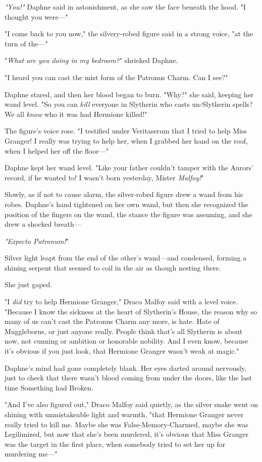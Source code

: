 \emph{"You!"} Daphne said in astonishment, as she saw the face beneath the 
hood. "I thought you were---"

"I come back to you now," the silvery-robed figure said in a strong voice, "at 
the turn of the---"

"\emph{What are you doing in my bedroom?}" shrieked Daphne.

"I heard you can cast the mist form of the Patronus Charm. Can I see?"

Daphne stared, and then her blood began to burn. "Why?" she said, keeping her 
wand level. "So you can \emph{kill} everyone in Slytherin who casts 
un-Slytherin spells? We all \emph{know} who it was had Hermione killed!"

The figure's voice rose. "I testified under Veritaserum that I tried to help 
Miss Granger! I really was trying to help her, when I grabbed her hand on the 
roof, when I helped her off the floor---"

Daphne kept her wand level. "Like your father couldn't tamper with the Aurors' 
record, if he wanted to! I wasn't born yesterday, Mister \emph{Malfoy!}"

Slowly, as if not to cause alarm, the silver-robed figure drew a wand from his 
robes. Daphne's hand tightened on her own wand, but then she recognized the 
position of the fingers on the wand, the stance the figure was assuming, and 
she drew a shocked breath---

\emph{"Expecto Patronum!}"

Silver light leapt from the end of the other's wand---and condensed, forming a 
shining serpent that seemed to coil in the air as though nesting there.

She just gaped.

"I \emph{did} try to help Hermione Granger," Draco Malfoy said with a level 
voice. "Because I know the sickness at the heart of Slytherin's House, the 
reason why so many of us can't cast the Patronus Charm any more, is hate. Hate 
of Muggleborns, or just anyone really. People think that's all Slytherin is 
about now, not cunning or ambition or honorable nobility. And I even know, 
because it's obvious if you just look, that Hermione Granger wasn't weak at 
magic."

Daphne's mind had gone completely blank. Her eyes darted around nervously, just 
to check that there wasn't blood coming from under the doors, like the last 
time Something had Broken.

"And I've also figured out," Draco Malfoy said quietly, as the silver snake 
went on shining with unmistakeable light and warmth, "that Hermione Granger 
never really tried to kill me. Maybe she was False-Memory-Charmed, maybe she 
was Legilimized, but now that she's been murdered, it's obvious that Miss 
Granger was the target in the first place, when somebody tried to set her up 
for murdering me---"

